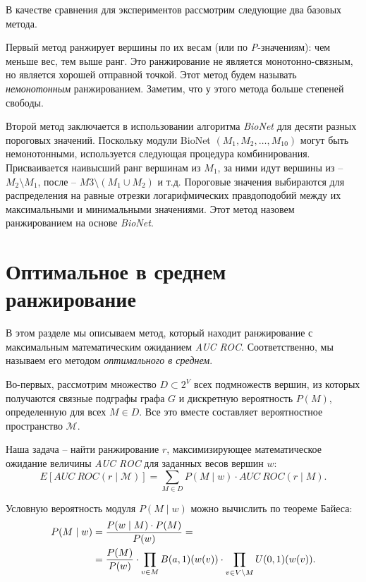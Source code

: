 В качестве сравнения для экспериментов рассмотрим следующие два базовых метода.

Первый метод ранжирует вершины по их весам (или по \emph{P}-значениям): чем
меньше вес, тем выше ранг.  Это ранжирование не является монотонно-связным, но
является хорошей отправной точкой.  Этот метод будем называть
\emph{немонотонным} ранжированием.  Заметим, что у этого метода больше степеней
свободы.

Второй метод заключается в использовании алгоритма \emph{BioNet} для десяти
разных пороговых значений.  Поскольку модули BioNet $(M_1, M_2, \ldots,
M_{10})$ могут быть немонотонными, используется следующая процедура
комбинирования.  Присваивается наивысший ранг вершинам из $M_1$, за ними идут
вершины из -- $M_2 \setminus M_1$, после -- $M3 \setminus (M_1 \cup M_2)$
и т.д. Пороговые значения выбираются для распределения на равные отрезки
логарифмических правдоподобий между их максимальными и минимальными значениями.
Этот метод назовем ранжированием на основе \emph{BioNet}.





\section{Оптимальное в среднем ранжирование}
\label{sec_optimal}

В этом разделе мы описываем метод, который находит ранжирование с максимальным
математическим ожиданием \emph{AUC ROC}. Соответственно, мы называем его
методом \emph{оптимального в среднем}.

Во-первых, рассмотрим множество $D \subset 2^V$ всех подмножеств вершин, из
которых получаются связные подграфы графа $G$ и дискретную вероятность $P(M)$,
определенную для всех $M \in D$. Все это вместе составляет вероятностное
пространство $\mathcal{M}$.

Наша задача -- найти ранжирование $r$, максимизирующее математическое ожидание
величины \emph{AUC ROC} для заданных весов вершин $w$:
\begin{equation} \label{formula:eauc} 
    E[AUC~ROC(r \mid \mathcal{M})] = \sum_{M \in D} P(M \mid w) \cdot AUC~ROC(r
    \mid M).
\end{equation}

Условную вероятность модуля $P(M \mid w)$ можно вычислить по теореме Байеса:
\begin{align}
    P(M \mid w) &= \frac{P(w \mid M) \cdot P(M)}{P(w)} = \notag \\
    &= \frac{P(M)}{P(w)} \cdot \prod_{v \in M} B(a,1)(w(v)) \cdot \prod_{v
    \in {V \setminus M}} U(0,1)(w(v)).
\end{align}

